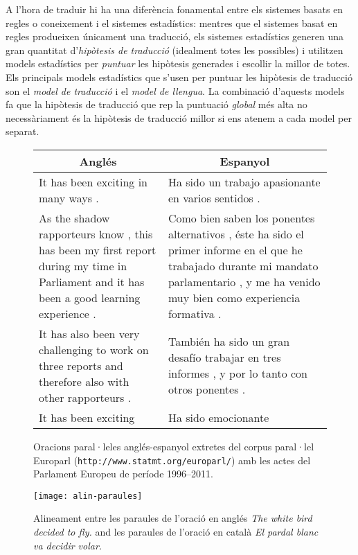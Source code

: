 A l'hora de traduir hi ha una diferència fonamental entre els sistemes
basats en regles o coneixement i el sistemes estadístics: mentres que
el sistemes basat en regles produeixen únicament una traducció, els
sistemes estadístics generen una gran quantitat d'\emph{hipòtesis de
  traducció} (idealment totes les possibles) i utilitzen models
estadístics per \emph{puntuar} les hipòtesis generades i escollir la
millor de totes. Els principals models estadístics que s'usen per
puntuar les hipòtesis de traducció son el \emph{model de traducció} i
el \emph{model de llengua}. La combinació d'aquests models fa que la
hipòtesis de traducció que rep la puntuació \emph{global} més alta no
necessàriament és la hipòtesis de traducció millor si ens atenem a
cada model per separat.

\begin{figure}
\centering
\begin{tabular}{p{6cm}|p{6cm}}
  \multicolumn{1}{c|}{\textbf{Anglés}} & \multicolumn{1}{c}{\textbf{Espanyol}}\\
  \hline
  It has been exciting in many ways . &
  Ha sido un trabajo apasionante en varios sentidos . \\
  \hline
  As the shadow rapporteurs know , this has been my first report
  during my time in Parliament and it has been a good learning
  experience . &
  Como bien saben los ponentes alternativos , éste ha sido el primer
  informe en el que he trabajado durante mi mandato parlamentario , y
  me ha venido muy bien como experiencia formativa . \\
  \hline
  It has also been very challenging to work on three reports and
  therefore also with other rapporteurs . &
  También ha sido un gran desafío trabajar en tres informes , y por lo
  tanto con otros ponentes . \\
  \hline
  It has been exciting  &
  Ha sido emocionante \\
  \hline
\end{tabular}
\caption{Oracions paral·leles anglés-espanyol extretes del corpus
  paral·lel Europarl (\texttt{http://www.statmt.org/europarl/}) amb
  les actes del Parlament Europeu de període 1996--2011.}
\label{fg:alinora}
\end{figure}


\begin{figure}
\centering
\texttt{[image: alin-paraules]}
\caption{Alineament entre les paraules de l'oració en anglés
  \emph{The white bird decided to fly.} and les paraules de l'oració en
català \emph{El pardal blanc va decidir volar.}}
\label{fg:alinpar}
\end{figure}


